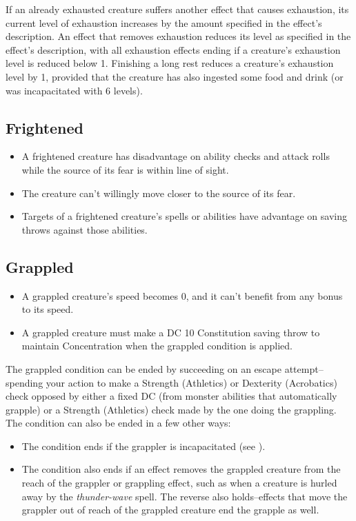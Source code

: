 If an already exhausted creature suffers another effect that causes exhaustion, its current level of exhaustion increases by the amount specified in the effect's description. An effect that removes exhaustion reduces its level as specified in the effect's description, with all exhaustion effects ending if a creature's exhaustion level is reduced below 1. Finishing a long rest reduces a creature's exhaustion level by 1, provided that the creature has also ingested some food and drink (or was incapacitated with 6 levels).

\subsection{Frightened\label{condition:frightened}}
\begin{itemize}
\item A frightened creature has disadvantage on ability checks and attack rolls while the source of its fear is within line of sight.
\item The creature can't willingly move closer to the source of its fear.
\item Targets of a frightened creature's spells or abilities have advantage on saving throws against those abilities.
\end{itemize}

\subsection{Grappled\label{condition:grappled}}
\begin{itemize}
\item A grappled creature's speed becomes 0, and it can't benefit from any bonus to its speed.
\item A grappled creature must make a DC 10 Constitution saving throw to maintain Concentration when the grappled condition is applied.
\end{itemize}

The grappled condition can be ended by succeeding on an escape attempt--spending your action to make a Strength (Athletics) or Dexterity (Acrobatics) check opposed by either a fixed DC (from monster abilities that automatically grapple) or a Strength (Athletics) check made by the one doing the grappling. The condition can also be ended in a few other ways:
\begin{itemize}
\item The condition ends if the grappler is incapacitated (see ).
\item The condition also ends if an effect removes the grappled creature from the reach of the grappler or grappling effect, such as when a creature is hurled away by the \textit{thunder-wave} spell. The reverse also holds--effects that move the grappler out of reach of the grappled creature end the grapple as well.
\end{itemize}

